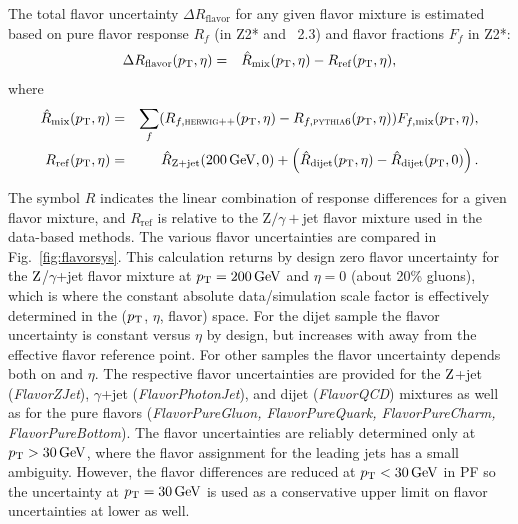 \documentclass[11pt,twoside,a4paper,cmspaper,final,collab]{cms-tdr}
\begin{document}
The total flavor uncertainty $\Delta R_\mathrm{flavor}$ for any given flavor mixture is estimated based on pure flavor response $R_f$ (in  Z2* and \HERWIGpp~2.3) and flavor fractions $F_f$ in  Z2*:
\begin{eqnarray}
\Delta R_\mathrm{flavor}(p_{\mathrm{T}}, \eta) &=& \hat{R}_\mathrm{mix}(p_{\mathrm{T}}, \eta) - R_\mathrm{ref}(p_{\mathrm{T}}, \eta),
\end{eqnarray}
where
\begin{eqnarray}
\hat{R}_\mathrm{mix}(\pt,\eta) &=&
\sum_f (R_{f,\rm \HERWIGpp}(\pt,\eta) - R_{f,\rm {\PYTHIA6}}(\pt,\eta))
 F_{f,\rm mix}(\pt,\eta), \label{eq:rhat}\\
R_\mathrm{ref}(\pt, \eta) &=& \hat{R}_\mathrm{Z+jet}(200\GeV, 0)
+ \left(\hat{R}_\mathrm{dijet}(\pt, \eta) - \hat{R}_\mathrm{dijet}(\pt, 0)\right).
\end{eqnarray}

The symbol $\hat{R}$ indicates the linear combination of response differences for a given flavor mixture, and $R_\mathrm{ref}$ is relative to the Z$/\gamma+$jet flavor mixture used in the data-based methods.
The various flavor uncertainties are compared in Fig.~\ref{fig:flavorsys}. This calculation returns by design zero flavor uncertainty for the $\mathrm{Z}$/$\gamma$+jet flavor mixture at $p_{\mathrm{T}}=200\,\text{Ge\hspace{-.08em}V}$ and $\eta=0$ (about 20\% gluons), which is where the constant absolute data/simulation scale factor is effectively determined in the ($p_{\mathrm{T}}$, $\eta$, flavor) space. For the dijet sample the flavor uncertainty is constant versus $\eta$ by design, but increases with \pt away from the effective flavor reference point. For other samples the flavor uncertainty depends both on \pt and $\eta$. The respective flavor uncertainties are provided for the $\mathrm{Z}$+jet (\textit{FlavorZJet}), $\gamma$+jet (\textit{FlavorPhotonJet}), and dijet (\textit{FlavorQCD}) mixtures as well as for the pure flavors (\textit{FlavorPureGluon, FlavorPureQuark, FlavorPureCharm, FlavorPureBottom}).
The flavor uncertainties are reliably determined only at $p_{\mathrm{T}}>30\,\text{Ge\hspace{-.08em}V}$, where the flavor assignment for the leading jets has a small ambiguity.
However, the flavor differences are reduced at $p_{\mathrm{T}}<30\,\text{Ge\hspace{-.08em}V}$
in PF so the uncertainty at $p_{\mathrm{T}}=30\,\text{Ge\hspace{-.08em}V}$ is used as a conservative upper limit on flavor uncertainties at lower \pt as well.
\end{document}
